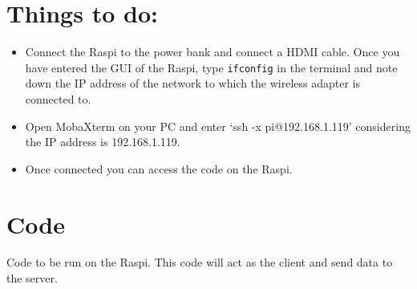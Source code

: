 \documentclass[]{article}
\providecommand{\tightlist}{%
  \setlength{\itemsep}{0pt}\setlength{\parskip}{0pt}}
\begin{document}
\section{Things to do:}\label{things-to-do}

\begin{itemize}
\tightlist
\item
  Connect the Raspi to the power bank and connect a HDMI cable. Once you
  have entered the GUI of the Raspi, type \texttt{ifconfig} in the
  terminal and note down the IP address of the network to which the
  wireless adapter is connected to.
\item
  Open MobaXterm on your PC and enter `ssh -x pi@192.168.1.119'
  considering the IP address is 192.168.1.119.
\item
  Once connected you can access the code on the Raspi.
\end{itemize}

\section{Code}\label{code}

Code to be run on the Raspi. This code will act as the client and send
data to the server.
\end{document}
